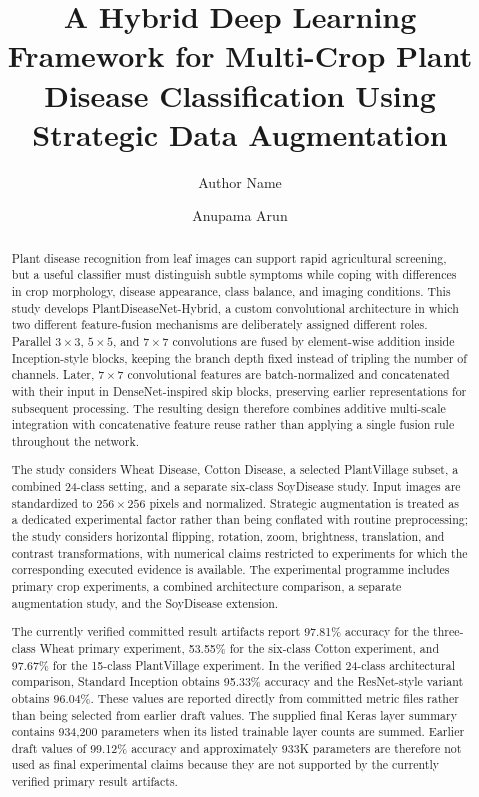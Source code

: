 \documentclass[a4paper,fleqn]{cas-dc}
\begin{document}
\let\WriteBookmarks\relax
{}

\title[mode=title]{A Hybrid Deep Learning Framework for Multi-Crop Plant Disease Classification Using Strategic Data Augmentation}

\author[1]{Author Name}
\author[1]{Anupama Arun}

\begin{abstract}
Plant disease recognition from leaf images can support rapid agricultural screening, but a useful classifier must distinguish subtle symptoms while coping with differences in crop morphology, disease appearance, class balance, and imaging conditions. This study develops PlantDiseaseNet-Hybrid, a custom convolutional architecture in which two different feature-fusion mechanisms are deliberately assigned different roles. Parallel $3\times3$, $5\times5$, and $7\times7$ convolutions are fused by element-wise addition inside Inception-style blocks, keeping the branch depth fixed instead of tripling the number of channels. Later, $7\times7$ convolutional features are batch-normalized and concatenated with their input in DenseNet-inspired skip blocks, preserving earlier representations for subsequent processing. The resulting design therefore combines additive multi-scale integration with concatenative feature reuse rather than applying a single fusion rule throughout the network.

The study considers Wheat Disease, Cotton Disease, a selected PlantVillage subset, a combined 24-class setting, and a separate six-class SoyDisease study. Input images are standardized to $256\times256$ pixels and normalized. Strategic augmentation is treated as a dedicated experimental factor rather than being conflated with routine preprocessing; the study considers horizontal flipping, rotation, zoom, brightness, translation, and contrast transformations, with numerical claims restricted to experiments for which the corresponding executed evidence is available. The experimental programme includes primary crop experiments, a combined architecture comparison, a separate augmentation study, and the SoyDisease extension.

The currently verified committed result artifacts report 97.81\% accuracy for the three-class Wheat primary experiment, 53.55\% for the six-class Cotton experiment, and 97.67\% for the 15-class PlantVillage experiment. In the verified 24-class architectural comparison, Standard Inception obtains 95.33\% accuracy and the ResNet-style variant obtains 96.04\%. These values are reported directly from committed metric files rather than being selected from earlier draft values. The supplied final Keras layer summary contains 934,200 parameters when its listed trainable layer counts are summed. Earlier draft values of 99.12\% accuracy and approximately 933K parameters are therefore not used as final experimental claims because they are not supported by the currently verified primary result artifacts.
\end{abstract}
\end{document}
